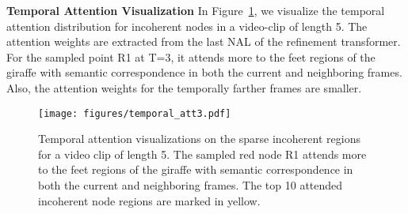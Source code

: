 \documentclass[runningheads]{llncs}
\newcommand{\parsection}[1]{\textbf{#1} }
\begin{document}
\parsection{Temporal Attention Visualization} 
In Figure~\ref{fig:attention}, we visualize the temporal attention distribution for incoherent nodes in a video-clip of length 5. The attention weights are extracted from the last NAL of the refinement transformer. For the sampled point R1 at T=3, it attends more to the feet regions of the giraffe with semantic correspondence in both the current and neighboring frames. Also, the attention weights for the temporally farther frames are smaller.


	\begin{figure}[!t]
	\centering
\texttt{[image: figures/temporal\_att3.pdf]}
\caption{Temporal attention visualizations on the sparse incoherent regions for a video clip of length 5. The sampled red node R1 attends more to the feet regions of the giraffe with semantic correspondence in both the current and neighboring frames. The top 10 attended incoherent node regions are marked in yellow.}
\label{fig:attention}
\end{figure}
\end{document}
